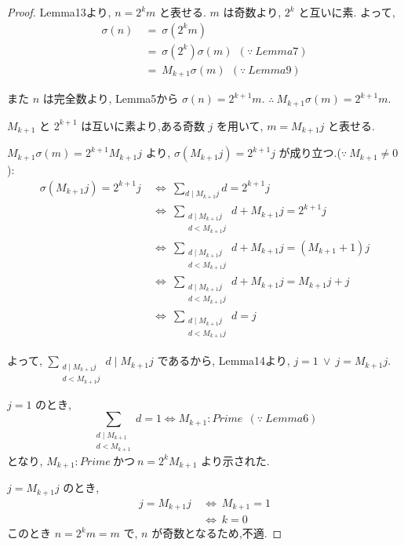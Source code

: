 \begin{proof}
Lemma13より, \(n = 2^km\) と表せる. \(m\) は奇数より, \(2^k\) と互いに素.
よって,
\begin{align*}
  \sigma(n) ~&=~ \sigma(2^km)\\
            ~&=~ \sigma(2^k)\sigma(m)~~(\because~Lemma7)\\
            ~&=~ M_{k+1}\sigma(m)~~(\because~Lemma9)
\end{align*}

また \(n\) は完全数より, Lemma5から \(\sigma(n) = 2^{k+1}m\). \(\therefore~ M_{k+1}\sigma(m) = 2^{k+1}m\).

\(M_{k+1}\) と \(2^{k+1}\) は互いに素より,ある奇数 \(j\) を用いて, \(m = M_{k+1}j\) と表せる.

\(M_{k+1} \sigma(m) = 2^{k+1} M_{k+1}j\) より, \(\sigma(M_{k+1}j) = 2^{k+1}j\) が成り立つ.(\(\because~M_{k+1} \neq 0\)):
\begin{align*}
  \sigma(M_{k+1}j) = 2^{k+1}j ~&\Leftrightarrow~ \sum_{d \mid M_{k+1}j} d = 2^{k+1}j\\
                              ~&\Leftrightarrow~ \sum_{\substack{d \mid M_{k+1}j\\ d < M_{k+1}j}} d + M_{k+1}j = 2^{k+1}j\\
                              ~&\Leftrightarrow~ \sum_{\substack{d \mid M_{k+1}j\\ d < M_{k+1}j}} d + M_{k+1}j = (M_{k+1}+1)j\\
                              ~&\Leftrightarrow~ \sum_{\substack{d \mid M_{k+1}j\\ d < M_{k+1}j}} d + M_{k+1}j = M_{k+1}j + j\\
                              ~&\Leftrightarrow~ \sum_{\substack{d \mid M_{k+1}j\\ d < M_{k+1}j}} d = j
\end{align*}

よって, \(\sum_{\substack{d \mid M_{k+1}j\\ d < M_{k+1}j}} d \mid M_{k+1}j\) であるから, Lemma14より, \(j = 1 ~\vee~ j = M_{k+1}j\).

\(j = 1\) のとき,
\[
\sum_{\substack{d \mid M_{k+1}\\ d < M_{k+1}}} d = 1 \Leftrightarrow M_{k+1} : Prime~~(\because~Lemma6)
\]
となり, \(M_{k+1} : Prime ~\text{かつ} ~n = 2^kM_{k+1}\) より示された.

\(j = M_{k+1}j\) のとき,
\begin{align*}
  j = M_{k+1}j ~&\Leftrightarrow~ M_{k+1} = 1\\
               ~&\Leftrightarrow~ k = 0
\end{align*}
このとき \(n = 2^km = m\) で, \(n\) が奇数となるため,不適.
\end{proof}


